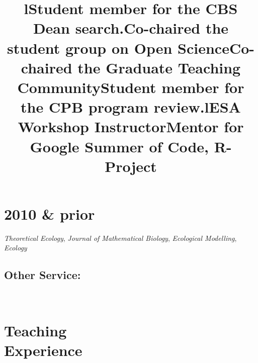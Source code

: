 \documentclass[margin]{res}
\begin{document}
\begin{resume}
\section{\textnormal{2010 \& prior}}
\emph{Theoretical Ecology}, \emph{Journal of Mathematical Biology}, \emph{Ecological Modelling}, \emph{Ecology}

\subsection{Other Service:} 
\begin{format}
\title{l}\\
\body 
\end{format}

\title{Student  member for the CBS Dean search.}
\begin{position} \vspace{-.7cm} \end{position}
\title{Co-chaired the student group on Open Science}
\begin{position} \vspace{-.7cm} \end{position}
\title{Co-chaired the Graduate Teaching Community}
\begin{position} \vspace{-.7cm} \end{position}
\title{Student member for the CPB program review.}
\begin{position} \vspace{.5cm} \end{position}


\section{Teaching\\Experience}
\begin{format}
\title{l}\\
\body
\end{format}

\title{ESA Workshop Instructor}
\begin{position}  
  \vspace{-.5cm}
\end{position}

\title{Mentor for Google Summer of Code, R-Project}
\begin{position}
  \vspace{-.5cm}
\end{position}


\end{resume}
\end{document}
